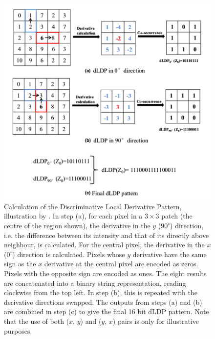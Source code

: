 \documentclass{report}
\begin{document}
\begin{figure}
\centering
\includegraphics[width=5in]{dLDP_jiang.pdf}
\caption{Calculation of the Discriminative Local Derivative Pattern, illustration by \cite{jiang2017fast}. In step (a), for each pixel in a $3\times 3$ patch (the centre of the region shown), the derivative in the $y$ ($90^{\circ}$) direction, i.e. the difference between its intensity and that of its directly above neighbour, is calculated. For the central pixel, the derivative in the $x$ ($0^{\circ}$) direction is calculated. Pixels whose $y$ derivative have the same sign as the $x$ derivative at the central pixel are encoded as zeros. Pixels with the opposite sign are encoded as ones. The eight results are concatenated into a binary string representation, reading clockwise from the top left. In step (b), this is repeated with the derivative directions swapped. The outputs from steps (a) and (b) are combined in step (c) to give the final 16 bit dLDP pattern. Note that the use of both ($x$, $y$) and ($y$, $x$) pairs is only for illustrative purposes.}
\label{fig:dLDP}
\end{figure}
\end{document}
